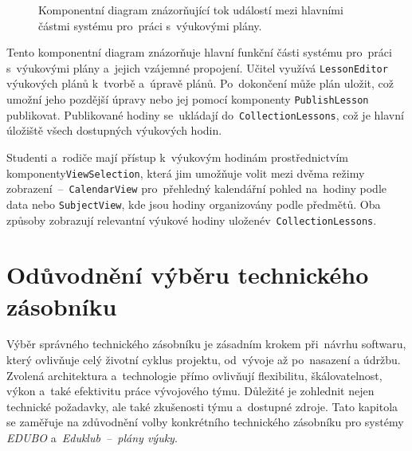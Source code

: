 \documentclass[male,czech,api_bc]{kitheses}
\begin{document}
\begin{figure}[H]
	\centering
	\caption{Komponentní diagram znázorňující tok událostí mezi hlavními částmi systému pro~práci s~výukovými plány.}
	\label{fig:component-diagram}
\end{figure}

Tento komponentní diagram znázorňuje hlavní funkční části systému pro~práci s~výukovými plány a~jejich vzájemné propojení. Učitel využívá \texttt{LessonEditor} výukových plánů k~tvorbě a~úpravě plánů. Po~dokončení může plán uložit, což umožní jeho pozdější úpravy nebo jej pomocí komponenty \texttt{PublishLesson} publikovat. Publikované hodiny se~ukládají do~\texttt{CollectionLessons}, což je hlavní úložiště všech dostupných výukových hodin.

Studenti a~rodiče mají přístup k~výukovým hodinám prostřednictvím komponenty\break\texttt{ViewSelection}, která jim umožňuje volit mezi dvěma režimy zobrazení~--~\texttt{CalendarView} pro~přehledný kalendářní pohled na~hodiny podle data nebo \texttt{SubjectView}, kde jsou hodiny organizovány podle předmětů. Oba způsoby zobrazují relevantní výukové hodiny uložené\break v~\texttt{CollectionLessons}.


\section{Odůvodnění výběru technického zásobníku}

Výběr správného technického zásobníku je zásadním krokem při~návrhu softwaru, který ovlivňuje celý životní cyklus projektu, od~vývoje až po~nasazení a údržbu. Zvolená architektura a~technologie přímo ovlivňují flexibilitu, škálovatelnost, výkon a~také efektivitu práce vývojového týmu. Důležité je zohlednit nejen technické požadavky, ale také zkušenosti týmu a~dostupné zdroje. Tato kapitola se zaměřuje na zdůvodnění volby konkrétního technického zásobníku pro systémy \textit{EDUBO} a~\textit{Eduklub~--~plány výuky}.
\end{document}
